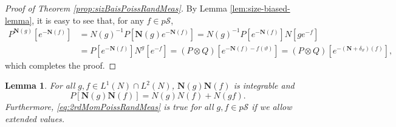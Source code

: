 \documentclass[UTF8]{pkuthss}
\theoremstyle{plain}
\newtheorem{lem}[thm]{Lemma}
\theoremstyle{definition}
\numberwithin{equation}{section}
\begin{document}
\begin{proof}[Proof of Theorem \ref{prop:sizBaisPoissRandMeas}]
	By Lemma \ref{lem:size-biased-lemma}, it is easy to see that, for any $f\in p\mathscr S$,
\[\begin{split}
	P^{\mathbf N(g)}[e^{-\mathbf N(f)}]
	&= N(g)^{-1} P[\mathbf N(g) e^{-\mathbf N(f)}]
	= N(g)^{-1} P[e^{-\mathbf N(f)}] N[ge^{-f}]\\
	&=  P[e^{-\mathbf N(f)}] N^g[e^{-f}]
	= (P\otimes Q)[e^{-\mathbf N(f) - f(\vartheta)}]
	= (P\otimes Q)[e^{-(\mathbf N + \delta_\vartheta)(f)}],
\end{split}\]
	which completes the proof.
\end{proof}
\begin{lem}\label{lem:covPoissRandMeas}
	For all $g, f \in L^1(N) \cap L^2(N)$, $\mathbf N(g) \mathbf N(f)$ is integrable and
\begin{equation}\label{eq:2rdMomPoissRandMeas}
	P [\mathbf N(g) \mathbf N(f)]
	= N(g) N(f) + N(g f).
\end{equation}
	Furthermore, \eqref{eq:2rdMomPoissRandMeas} is true for all $g,f\in p\mathscr S$ if we allow extended values.
\end{lem}
\end{document}
